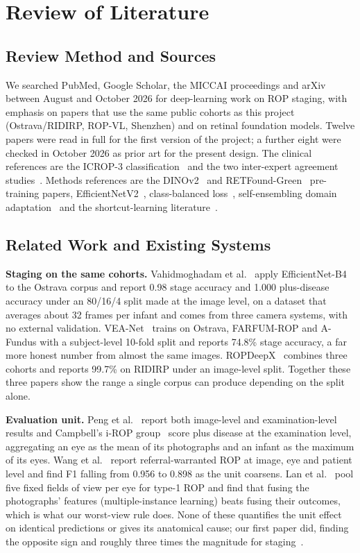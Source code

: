 \chapter{Review of Literature}\label{ch:literature}
\section{Review Method and Sources}
We searched PubMed, Google Scholar, the MICCAI proceedings and arXiv between August and October 2026 for deep-learning work on ROP staging, with emphasis on papers that use the same public cohorts as this project (Ostrava/RIDIRP, ROP-VL, Shenzhen) and on retinal foundation models. Twelve papers were read in full for the first version of the project; a further eight were checked in October 2026 as prior art for the present design. The clinical references are the ICROP-3 classification~\cite{icrop3} and the two inter-expert agreement studies~\cite{gschliesser2015,campbell2016}. Methods references are the DINOv2~\cite{oquab2024} and RETFound-Green~\cite{engelmann2025} pre-training papers, EfficientNetV2~\cite{tan2021}, class-balanced loss~\cite{cui2019}, self-ensembling domain adaptation~\cite{french2018} and the shortcut-learning literature~\cite{degrave2021,oakden2020}.

\section{Related Work and Existing Systems}
\textbf{Staging on the same cohorts.} Vahidmoghadam et al.~\cite{vahid2026} apply EfficientNet-B4 to the Ostrava corpus and report 0.98 stage accuracy and 1.000 plus-disease accuracy under an 80/16/4 split made at the image level, on a dataset that averages about 32 frames per infant and comes from three camera systems, with no external validation. VEA-Net~\cite{wang2026} trains on Ostrava, FARFUM-ROP and A-Fundus with a subject-level 10-fold split and reports 74.8\% stage accuracy, a far more honest number from almost the same images. ROPDeepX~\cite{kumar2026} combines three cohorts and reports 99.7\% on RIDIRP under an image-level split. Together these three papers show the range a single corpus can produce depending on the split alone.

\textbf{Evaluation unit.} Peng et al.~\cite{peng2021} report both image-level and examination-level results and Campbell's i-ROP group~\cite{campbell2018,derks2025} score plus disease at the examination level, aggregating an eye as the mean of its photographs and an infant as the maximum of its eyes. Wang et al.~\cite{wang2021} report referral-warranted ROP at image, eye and patient level and find F1 falling from 0.956 to 0.898 as the unit coarsens. Lan et al.~\cite{lan2026} pool five fixed fields of view per eye for type-1 ROP and find that fusing the photographs' features (multiple-instance learning) beats fusing their outcomes, which is what our worst-view rule does. None of these quantifies the unit effect on identical predictions or gives its anatomical cause; our first paper did, finding the opposite sign and roughly three times the magnitude for staging~\cite{nagpure2026}.

